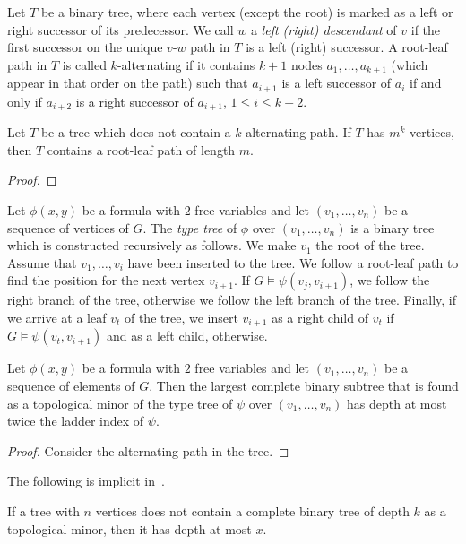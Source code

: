 Let $T$ be a binary tree, where each vertex (except the root) is 
marked as a left or right successor of its predecessor. We call $w$ 
a \emph{left (right) descendant} of $v$ if the first successor on the unique
$v$-$w$ path in $T$ is a left (right) successor. A root-leaf path in $T$ is called
$k$-alternating if it contains $k+1$ nodes $a_1,\ldots, a_{k+1}$ (which appear
in that order on the path) such that $a_{i+1}$ is a left successor of $a_i$
if and only if $a_{i+2}$ is a right successor of $a_{i+1}$, $1\leq i\leq k-2$. 

\begin{lemma}
Let $T$ be a tree which does not contain a $k$-alternating path. If
$T$ has $m^k$ vertices, then $T$ contains a root-leaf path of length
$m$. 
\end{lemma}
\begin{proof}

\end{proof}


Let $\phi(x,y)$ be a formula with $2$ free variables and let $(v_1,\ldots, v_n)$
be a sequence of vertices of $G$. The \emph{type tree}
of $\phi$ over $(v_1,\ldots,v_n)$ is a binary tree which is constructed recursively as 
follows. We make $v_1$ the root of the tree. Assume that $v_1,\ldots, v_i$
have been inserted to the tree. We follow a root-leaf path to find the
position for the next vertex $v_{i+1}$. If $G\models\psi(v_j,v_{i+1})$, we
follow the right branch of the tree, otherwise we follow the left branch of 
the tree. Finally, if we arrive at a leaf $v_t$ of the tree, we insert $v_{i+1}$
as a right child of $v_t$ if $G\models\psi(v_t,v_{i+1})$ and as a left 
child, otherwise. 


\begin{theorem}
Let $\phi(x,y)$ be a formula with $2$ free variables and let
$(v_1,\ldots, v_n)$ be a sequence of elements of $G$. Then the 
largest complete binary subtree that is found as a topological minor 
of the type tree of $\psi$ over
$(v_1,\ldots, v_n)$ has depth at most twice the ladder
index of $\psi$. 
\end{theorem}
\begin{proof}
Consider the alternating path in the tree. 
\end{proof}

The following is implicit in~\cite{malliaris2014regularity}. 

\begin{lemma}[reference?]\label{lem:depth}
If a tree with $n$ vertices does not contain a complete binary 
tree of depth $k$ as a topological minor, then it has depth at most 
$x$. 
\end{lemma}

